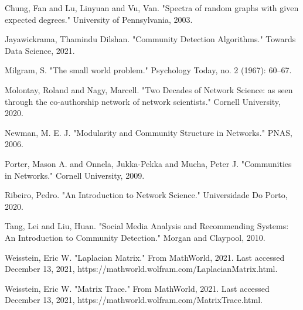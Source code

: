 \documentclass{article}
\begin{document}
\noindent Chung, Fan and Lu, Linyuan and Vu, Van. "Spectra of random graphs with given expected degrees." University of Pennsylvania, 2003.

\bigskip

\noindent Jayawickrama, Thamindu Dilshan. "Community Detection Algorithms." Towards Data Science, 2021.

\bigskip 

\noindent Milgram, S. "The small world problem." Psychology Today, no. 2 (1967): 60–67.

\bigskip

\noindent Molontay, Roland and Nagy, Marcell. "Two Decades of Network Science: as seen through the co-authorship network of network scientists." Cornell University, 2020.

\bigskip 

\noindent Newman, M. E. J. "Modularity and Community Structure in Networks." PNAS, 2006.

\bigskip

\noindent Porter, Mason A. and Onnela, Jukka-Pekka and Mucha, Peter J. "Communities in Networks." Cornell University, 2009.

\bigskip 

\noindent Ribeiro, Pedro. "An Introduction to Network Science." Universidade Do Porto, 2020. 

\bigskip

\noindent Tang, Lei and Liu, Huan. "Social Media Analysis and Recommending Systems: An Introduction to Community Detection." Morgan and Claypool, 2010.

\bigskip

\noindent Weisstein, Eric W. "Laplacian Matrix." From MathWorld, 2021. Last accessed December 13, 2021, https://mathworld.wolfram.com/LaplacianMatrix.html.

\bigskip

\noindent Weisstein, Eric W. "Matrix Trace." From MathWorld, 2021. Last accessed December 13, 2021, https://mathworld.wolfram.com/MatrixTrace.html.


\end{document}
